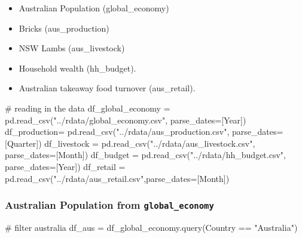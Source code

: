 \documentclass[
  11pt,
]{article}
\newenvironment{Shaded}{\begin{snugshade}}{\end{snugshade}}
\newcommand{\CommentTok}[1]{\textcolor[rgb]{0.37,0.37,0.37}{#1}}
\newcommand{\NormalTok}[1]{\textcolor[rgb]{0.00,0.23,0.31}{#1}}
\newcommand{\OperatorTok}[1]{\textcolor[rgb]{0.37,0.37,0.37}{#1}}
\newcommand{\StringTok}[1]{\textcolor[rgb]{0.13,0.47,0.30}{#1}}
\begin{document}
\begin{itemize}
\item
  Australian Population (global\_economy)
\item
  Bricks (aus\_production)
\item
  NSW Lambs (aus\_livestock)
\item
  Household wealth (hh\_budget).
\item
  Australian takeaway food turnover (aus\_retail).
\end{itemize}

\begin{Shaded}
\begin{Highlighting}[]
\CommentTok{\# reading in the data}
\NormalTok{df\_global\_economy }\OperatorTok{=}\NormalTok{ pd.read\_csv(}\StringTok{"../rdata/global\_economy.csv"}\NormalTok{, parse\_dates}\OperatorTok{=}\NormalTok{[}\StringTok{\textquotesingle{}Year\textquotesingle{}}\NormalTok{])}
\NormalTok{df\_production}\OperatorTok{=}\NormalTok{ pd.read\_csv(}\StringTok{"../rdata/aus\_production.csv"}\NormalTok{, parse\_dates}\OperatorTok{=}\NormalTok{[}\StringTok{\textquotesingle{}Quarter\textquotesingle{}}\NormalTok{])}
\NormalTok{df\_livestock }\OperatorTok{=}\NormalTok{ pd.read\_csv(}\StringTok{"../rdata/aus\_livestock.csv"}\NormalTok{, parse\_dates}\OperatorTok{=}\NormalTok{[}\StringTok{\textquotesingle{}Month\textquotesingle{}}\NormalTok{])}
\NormalTok{df\_budget }\OperatorTok{=}\NormalTok{ pd.read\_csv(}\StringTok{"../rdata/hh\_budget.csv"}\NormalTok{, parse\_dates}\OperatorTok{=}\NormalTok{[}\StringTok{\textquotesingle{}Year\textquotesingle{}}\NormalTok{])}
\NormalTok{df\_retail }\OperatorTok{=}\NormalTok{ pd.read\_csv(}\StringTok{"../rdata/aus\_retail.csv"}\NormalTok{,parse\_dates}\OperatorTok{=}\NormalTok{[}\StringTok{\textquotesingle{}Month\textquotesingle{}}\NormalTok{])}
\end{Highlighting}
\end{Shaded}

\subsubsection{\texorpdfstring{Australian Population from
\texttt{global\_economy}}{Australian Population from global\_economy}}\label{australian-population-from-global_economy}

\begin{Shaded}
\begin{Highlighting}[]
\CommentTok{\# filter australia}
\NormalTok{df\_aus }\OperatorTok{=}\NormalTok{ df\_global\_economy.query(}\StringTok{\textquotesingle{}Country == "Australia"\textquotesingle{}}\NormalTok{)}
\end{Highlighting}
\end{Shaded}
\end{document}
